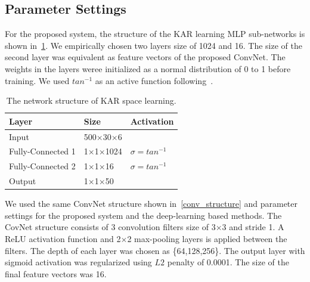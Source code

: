 \subsection{Parameter Settings}
For the proposed system, the structure of the KAR learning MLP sub-networks is shown in~\ref{kar_structure}. We empirically chosen two layers size of 1024 and 16. The size of the second layer was equivalent as feature vectors of the proposed ConvNet. The weights in the layers weree initialized as a normal distribution of 0 to 1 before training.
We used $tan^{-1}$ as an active function following~\cite{toh2018analytic}.
\begin{table}[]
    \caption{The network structure of KAR space learning.}
    \label{kar_structure}
    \centering
    \begin{tabular}{|l|l|l|}
    \hline
    Layer   & Size     & Activation \\ \hline
    Input   & 500$\times$30$\times$6 &            \\
    Fully-Connected 1 & 1$\times$1$\times$1024 & $\sigma = {tan}^{-1}$     \\
    Fully-Connected 2 & 1$\times$1$\times$16  & $\sigma = {tan}^{-1}$     \\
    Output  & 1$\times$1$\times$50   &            \\ \hline
    \end{tabular}
\end{table}
We used the same ConvNet structure shown in~\ref{conv_structure} and parameter settings for the proposed system and the deep-learning based methods. The CovNet structure consists of 3  convolution filters size of 3$\times$3 and stride 1. A ReLU activation function and 2$\times$2 max-pooling layers is applied between the filters. The depth of each layer was chosen as \{64,128,256\}. The output layer with sigmoid activation was regularized using $L2$ penalty of 0.0001. The size of the final feature vectors was 16.
